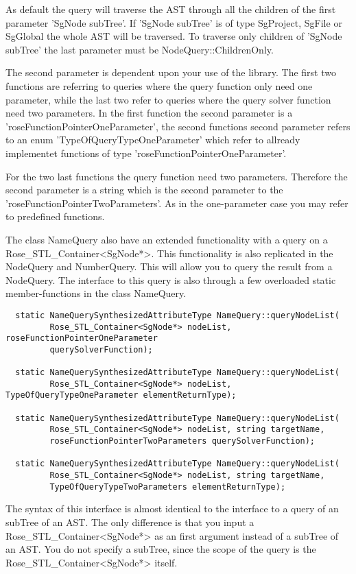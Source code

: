 {As default the query will traverse the AST through all the children of the
first parameter 'SgNode subTree'. If 'SgNode subTree' is of type SgProject, 
SgFile or SgGlobal the whole AST will be traversed. To traverse only children
of 'SgNode subTree' the last parameter must be NodeQuery::ChildrenOnly. 

The second parameter is dependent upon your use of the library. The
first two functions are referring to queries where the query function
only need one parameter, while the last two refer to queries where the 
query solver function need two parameters. In the first function the second
parameter is a 'roseFunctionPointerOneParameter', the second functions
second parameter refers to an enum 'TypeOfQueryTypeOneParameter' which 
refer to allready implementet functions of type 
'roseFunctionPointerOneParameter'. 

For the two last functions the query function need two
parameters. Therefore the second parameter is a string which is the
second parameter to the 'roseFunctionPointerTwoParameters'. As in the
one-parameter case you may refer to predefined functions.

The class NameQuery also have an extended functionality with a query
on a Rose\_STL\_Container<SgNode*>. This functionality is also replicated in the
NodeQuery and NumberQuery. This will allow you to query the result
from a NodeQuery. The interface to this query is also through a few
overloaded static member-functions in the class NameQuery.
\begin{verbatim}
  static NameQuerySynthesizedAttributeType NameQuery::queryNodeList(
         Rose_STL_Container<SgNode*> nodeList, roseFunctionPointerOneParameter
         querySolverFunction);

  static NameQuerySynthesizedAttributeType NameQuery::queryNodeList(
         Rose_STL_Container<SgNode*> nodeList, TypeOfQueryTypeOneParameter elementReturnType);
	  
  static NameQuerySynthesizedAttributeType NameQuery::queryNodeList(
         Rose_STL_Container<SgNode*> nodeList, string targetName, 
         roseFunctionPointerTwoParameters querySolverFunction);  

  static NameQuerySynthesizedAttributeType NameQuery::queryNodeList(
         Rose_STL_Container<SgNode*> nodeList, string targetName, 
         TypeOfQueryTypeTwoParameters elementReturnType);
\end{verbatim}
The syntax of this interface is almost identical to the interface to a query
of an subTree of an AST.  The only difference is that you input a
Rose\_STL\_Container<SgNode*> as an first argument instead of a subTree of an AST. You
do not specify a subTree, since the scope of the query is the Rose\_STL\_Container<SgNode*> itself.  
 


}
